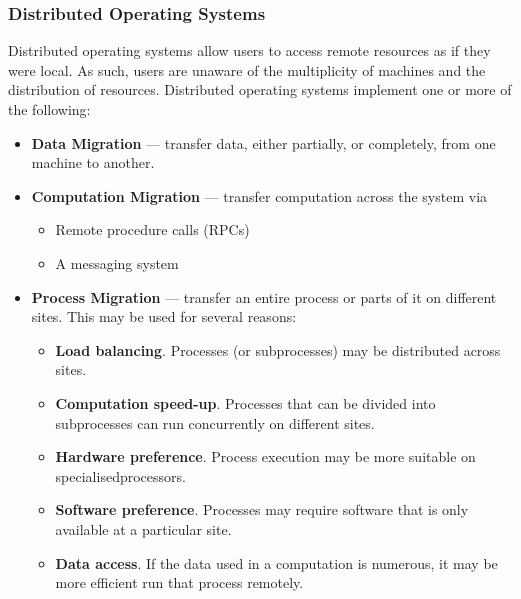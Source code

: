 \documentclass{article}
\begin{document}
\subsubsection{Distributed Operating Systems}
Distributed operating systems allow users to access remote resources as
if they were local. As such, users are unaware of the multiplicity of
machines and the distribution of resources. Distributed operating
systems implement one or more of the following:
\begin{itemize}
    \item \textbf{Data Migration} --- transfer data, either partially,
          or completely, from one machine to another.
    \item \textbf{Computation Migration} --- transfer computation across
          the system via
          \begin{itemize}
              \item Remote procedure calls (RPCs)
              \item A messaging system
          \end{itemize}
    \item \textbf{Process Migration} --- transfer an entire process
          or parts of it on different sites. This may be used for several
          reasons:
          \begin{itemize}
              \item \textbf{Load balancing}. Processes (or
                    subprocesses) may be distributed across sites.
              \item \textbf{Computation speed-up}. Processes that can
                    be divided into subprocesses can run concurrently on
                    different sites.
              \item \textbf{Hardware preference}. Process execution
                    may be more suitable on specialised\linebreak processors.
              \item \textbf{Software preference}. Processes may
                    require software that is only available at a
                    particular site.
              \item \textbf{Data access}. If the data used in a
                    computation is numerous, it may be more efficient
                    run that process remotely.
          \end{itemize}
\end{itemize}
\end{document}
